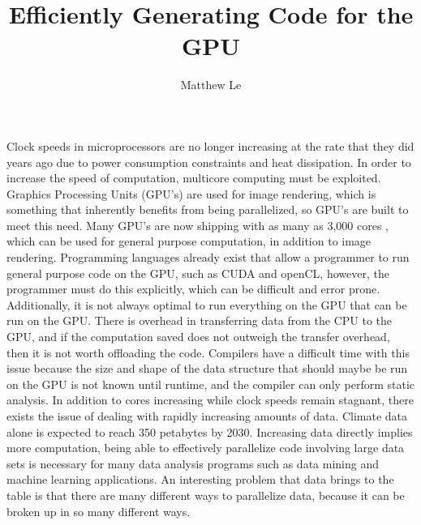 \documentclass[a4paper,12pt]{article}
\title{Efficiently Generating Code for the GPU \vspace{-2ex}}
\author{Matthew Le \vspace {-1ex}}
\newcommand{\tab}{\hspace*{2em}}
\begin{document}
\maketitle

\tab Clock speeds in microprocessors are no longer increasing at the rate that they did years ago due to power consumption constraints and heat dissipation.  In order to increase the speed of computation, multicore computing must be exploited. Graphics Processing Units (GPU's) are used for image rendering, which is something that inherently benefits from being parallelized, so GPU's are built to meet this need.  Many GPU's are now shipping with as many as 3,000 cores \cite{nvideaGPU}, which can be used for general purpose computation, in addition to image rendering.\newline
\tab Programming languages already exist that allow a programmer to run general purpose code on the GPU, such as CUDA and openCL, however, the programmer must do this explicitly, which can be difficult and error prone.  Additionally, it is not always optimal to run everything on the GPU that can be run on the GPU.  There is overhead in transferring data from the CPU to the GPU\cite{dymand}, and if the computation saved does not outweigh the transfer overhead, then it is not worth offloading the code.  Compilers have a difficult time with this issue because the size and shape of the data structure that should maybe be run on the GPU is not known until runtime, and the compiler can only perform static analysis.
\newline
\tab In addition to cores increasing while clock speeds remain stagnant, there exists the issue of dealing with rapidly increasing amounts of data.  Climate data alone is expected to reach 350 petabytes by 2030\cite{climateData}.  Increasing data directly implies more computation, being able to effectively parallelize code involving large data sets is necessary for many data analysis programs such as data mining and machine learning applications.  An interesting problem that data brings to the table is that there are many different ways to parallelize data, because it can be broken up in so many different ways.
\end{document}
